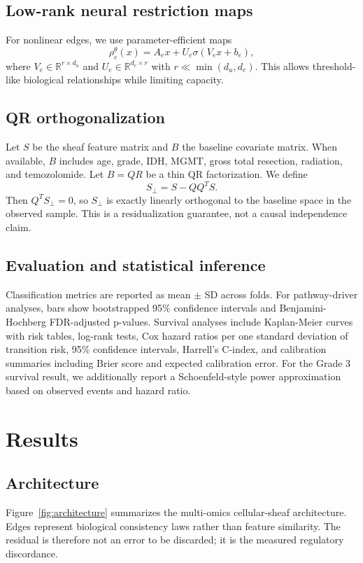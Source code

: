 \documentclass[conference]{IEEEtran}
\begin{document}
\subsection{Low-rank neural restriction maps}
For nonlinear edges, we use parameter-efficient maps
\begin{equation}
\rho_e^\theta(x)=A_ex+U_e\sigma(V_ex+b_e),
\end{equation}
where $V_e\in\mathbb R^{r\times d_u}$ and $U_e\in\mathbb R^{d_e\times r}$ with $r\ll\min(d_u,d_e)$. This allows threshold-like biological relationships while limiting capacity.

\subsection{QR orthogonalization}
Let $S$ be the sheaf feature matrix and $B$ the baseline covariate matrix. When available, $B$ includes age, grade, IDH, MGMT, gross total resection, radiation, and temozolomide. Let $B=QR$ be a thin QR factorization. We define
\begin{equation}
S_\perp=S-QQ^TS.
\end{equation}
Then $Q^TS_\perp=0$, so $S_\perp$ is exactly linearly orthogonal to the baseline space in the observed sample. This is a residualization guarantee, not a causal independence claim.

\subsection{Evaluation and statistical inference}
Classification metrics are reported as mean $\pm$ SD across folds. For pathway-driver analyses, bars show bootstrapped 95\% confidence intervals and Benjamini-Hochberg FDR-adjusted p-values. Survival analyses include Kaplan-Meier curves with risk tables, log-rank tests, Cox hazard ratios per one standard deviation of transition risk, 95\% confidence intervals, Harrell's C-index, and calibration summaries including Brier score and expected calibration error. For the Grade 3 survival result, we additionally report a Schoenfeld-style power approximation based on observed events and hazard ratio.

\section{Results}
\subsection{Architecture}
Figure~\ref{fig:architecture} summarizes the multi-omics cellular-sheaf architecture. Edges represent biological consistency laws rather than feature similarity. The residual is therefore not an error to be discarded; it is the measured regulatory discordance.
\end{document}
